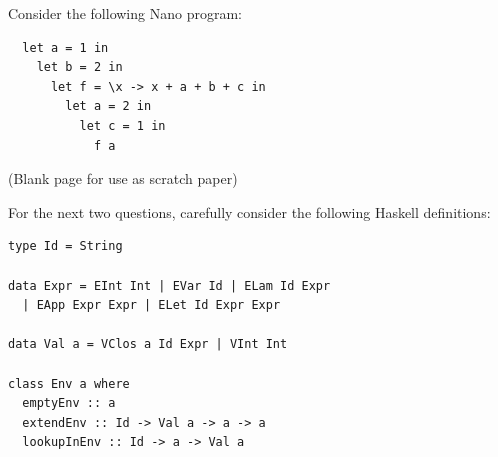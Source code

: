 \documentclass[addpoints]{exam}
\begin{document}
\begin{questions}
\begin{parts}
\end{parts}

\newpage

\question Consider the following Nano program:
\begin{verbatim}
  let a = 1 in
    let b = 2 in
      let f = \x -> x + a + b + c in
        let a = 2 in
          let c = 1 in
            f a
\end{verbatim}



\newpage

(Blank page for use as scratch paper)

\newpage

For the next two questions, carefully consider the following Haskell definitions:

\begin{verbatim}
type Id = String

data Expr = EInt Int | EVar Id | ELam Id Expr
  | EApp Expr Expr | ELet Id Expr Expr

data Val a = VClos a Id Expr | VInt Int

class Env a where
  emptyEnv :: a
  extendEnv :: Id -> Val a -> a -> a
  lookupInEnv :: Id -> a -> Val a


\end{verbatim}
\end{questions}
\end{document}
